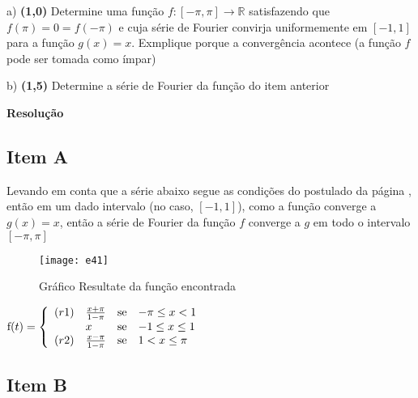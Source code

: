\documentclass[12pt,openany, letterpaper]{book}
\newcommand{\Resolve}{\begin{center} \textbf{Resolução} \end{center}}
\begin{document}
{{ \hspace{5mm}a) \textbf{(1,0)} Determine uma função $f:[-\pi,\pi] \rightarrow \mathds{R}$ satisfazendo que $f(\pi) = 0 = f(-\pi)$ e cuja série de Fourier convirja uniformemente  em $[-1,1]$ para a função $g(x) =x$. Exmplique porque a convergência acontece (a função $f$ pode ser tomada como ímpar)

b) \textbf{(1,5)}  Determine a série de Fourier da função do item anterior

\Resolve 

\subsection*{Item A}
\hspace{5mm}Levando em conta que a série abaixo segue as condições do postulado da página \pageref{enunciado}, então em um dado intervalo (no caso, $[-1,1]$), como a função converge a $g(x) = x$, então a série de Fourier da função $f$ converge a $g$ em todo o intervalo $[-\pi, \pi]$
\begin{figure}[ht]
\centering
\texttt{[image: e41]}
\caption{Gráfico Resultate da função encontrada}
\label{fig:res4-p2}
\end{figure}
\begin{center}
    $\hbox{f}(t)
    = \left\{ \begin{array}{rlll}
    (r1) & \frac{x+\pi}{1-\pi} & \hbox{se} &  -\pi \leq x < 1 \\
    & x & \hbox{se} &  -1 \leq x \leq 1 \\
    (r2) & \frac{x-\pi}{1-\pi} & \hbox{se} & 1 < x \leq \pi \\
    \end{array}\right.$
\end{center}

\subsection*{Item B}

}}
\end{document}

